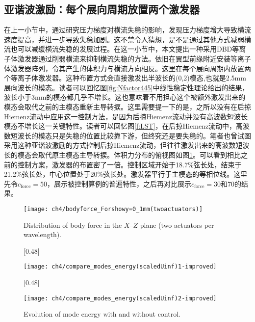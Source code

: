 \subsection{亚谐波激励：每个展向周期放置两个激发器}\label{subs:control2}
在上一小节中，通过研究压力梯度对横流失稳的影响，发现压力梯度增大导致横流速度提高，并进一步导致失稳加剧。这不禁令人猜想，是不是通过其他方式减弱横流也可以减缓横流失稳的发展过程。在这一小节中，本文提出一种采用DBD等离子体激发器通过削弱横流来抑制横流失稳的方法。依旧在翼型前缘附近安装等离子体激发器阵列，令其产生的体积力与横流方向相反。这里在每个展向周期内放置两个等离子体激发器。这种布置方式会直接激发出半波长的(0,2)模态,也就是2.5mm展向波长的模态。读者可以回忆图\ref{fig:Nfactor445}中线性稳定性理论给出的结果，波长小于3mm的模态都几乎不增长。这也意味着不用担心这个被额外激发出来的模态会取代之前的主模态重新主导转捩。这里需要提一下的是，之所以没有在后掠Hiemenz流动中应用这一控制方法，是因为后掠Hiemenz流动并没有高波数短波长模态不增长这一关键特性。读者可以回忆图\ref{f:LST}，在后掠Hiemenz流动中，高波数短波长的模态只是失稳的位置比较靠下游，但终究还是要失稳的。笔者也曾试图采用这种亚谐波激励的方式控制后掠Hiemenz流动，但往往激发出来的高波数短波长的模态会取代原主模态主导转捩。体积力分布的俯视图如图\ref{f:force2perwavelength}。可以看到相比之前的控制方案，激发器的布置密了一倍。控制区域开始于18.7\%弦长处，结束于21.2\%弦长处，中心位置处于20\%弦长处。激发器平行于主模态的等相位线。这里先令$c_\mathrm{force}=50$，展示被控制算例的普遍特性，之后再对比展示$c_\mathrm{force}=30$和70的结果。
\begin{figure}[htb]
\centering
  \texttt{[image: ch4/bodyforce\_Forshowy=0\_1mm(twoactuators)]}
  \caption{Distribution of  body force in the $X$--$Z$ plane (two actuators per wavelength).}%
  \label{f:force2perwavelength}
\end{figure}
\begin{figure}[htb]
\centering
  \subcaptionbox{\label{f:basecase_a}}[0.48\textwidth]{

    \texttt{[image: ch4/compare\_modes\_energy(scaledUinf)1-improved]}}
  \subcaptionbox{\label{f:basecase_b}}[0.48\textwidth]{

    \texttt{[image: ch4/compare\_modes\_energy(scaledUinf)2-improved]}}
  \caption{Evolution of mode energy with and without control.}%
  \label{f:basecase}
\end{figure}

